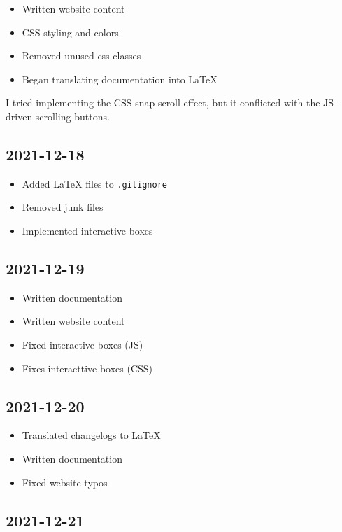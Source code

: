 \documentclass{article}
\begin{document}
\begin{itemize}
    \item Written website content
    \item CSS styling and colors
    \item Removed unused css classes
    \item Began translating documentation into LaTeX
\end{itemize}

I tried implementing the CSS snap-scroll effect,
but it conflicted with the JS-driven scrolling buttons.

\subsection*{2021-12-18}

\begin{itemize}
    \item Added LaTeX files to \texttt{.gitignore}
    \item Removed junk files
    \item Implemented interactive boxes
\end{itemize} %

\subsection*{2021-12-19}

\begin{itemize}
    \item Written documentation
    \item Written website content
    \item Fixed interactive boxes (JS)
    \item Fixes interacttive boxes (CSS)
\end{itemize} %

\subsection*{2021-12-20}

\begin{itemize}
    \item Translated changelogs to LaTeX
    \item Written documentation
    \item Fixed website typos
\end{itemize}

\subsection*{2021-12-21}
\end{document}
